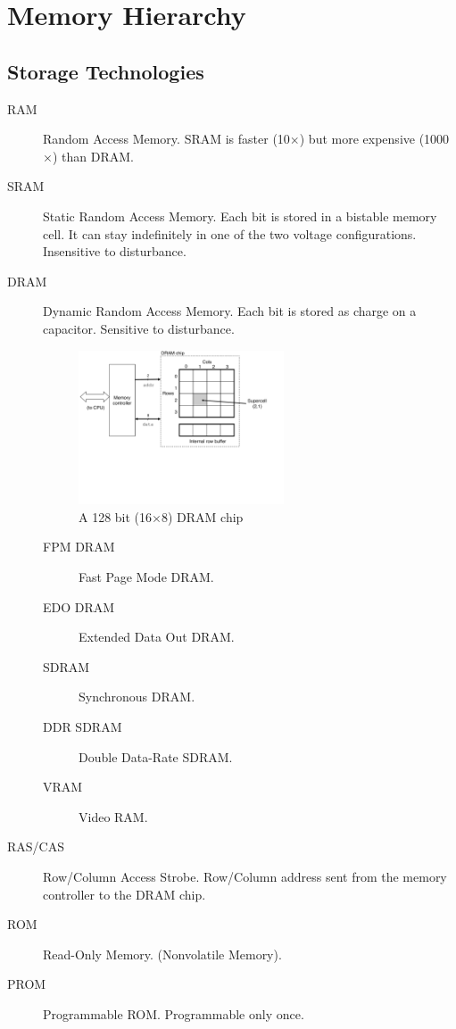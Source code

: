 \ifx\PREAMBLE\undefined


\fi
\newpage
\section{Memory Hierarchy}
\subsection{Storage Technologies}
\begin{description}
\item[RAM]Random Access Memory. SRAM is faster (10$\times$) but more expensive (1000$\times$) than DRAM.
\item[SRAM]Static Random Access Memory. Each bit is stored in a bistable memory cell. It can stay indefinitely in one of the two voltage configurations. Insensitive to disturbance.
\item[DRAM]Dynamic Random Access Memory. Each bit is stored as charge on a capacitor. Sensitive to disturbance. 
\begin{figure}[ht]
\centering
\includegraphics[width=0.6\textwidth]{dram.pdf}
\caption{A 128 bit (16$\times$8) DRAM chip}
\end{figure}
\begin{description}
	\item[FPM DRAM]Fast Page Mode DRAM.
	\item[EDO DRAM]Extended Data Out DRAM.
	\item[SDRAM]Synchronous DRAM.
	\item[DDR SDRAM]Double Data-Rate SDRAM.
	\item[VRAM]Video RAM.
\end{description}
\item[RAS/CAS]Row/Column Access Strobe. Row/Column address sent from the memory controller to the DRAM chip.
\item[ROM]Read-Only Memory. (Nonvolatile Memory).
\item[PROM]Programmable ROM. Programmable only once.

\end{description}
